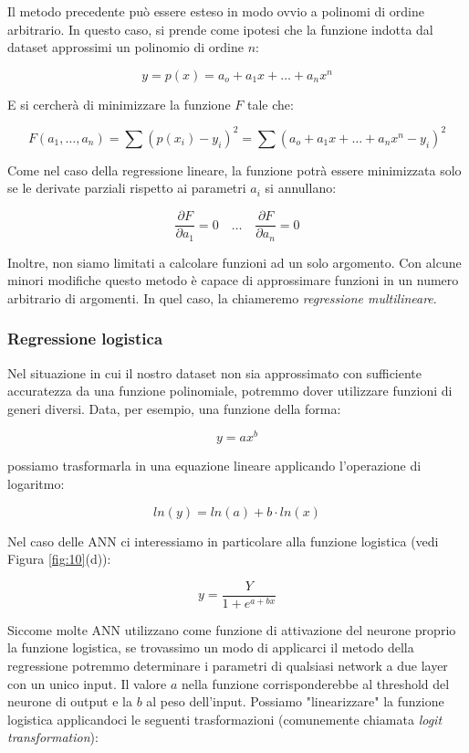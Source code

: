 \documentclass[10pt,a4paper]{article}
\begin{document}
Il metodo precedente può essere esteso in modo ovvio a polinomi di ordine arbitrario. In questo caso, si prende come ipotesi che la funzione indotta dal dataset approssimi un polinomio di ordine $n$:

$$
y = p(x) = a_o + a_1x + \dots + a_nx^n
$$

E si cercherà di minimizzare la funzione $F$ tale che:

$$
F(a_1,\dots,a_n) = \sum(p(x_i) - y_i)^2 = \sum(a_o + a_1x + \dots + a_nx^n -y_i)^2
$$

Come nel caso della regressione lineare, la funzione potrà essere minimizzata solo se le derivate parziali rispetto ai parametri $a_i$ si annullano:

$$
\frac{\partial F}{\partial a_1} = 0 \quad \dots \quad \frac{\partial F}{\partial a_n} = 0
$$

Inoltre, non siamo limitati a calcolare funzioni ad un solo argomento. Con alcune minori modifiche questo metodo è capace di approssimare funzioni in un numero arbitrario di argomenti. In quel caso, la chiameremo \emph{regressione multilineare}.

\subsubsection{Regressione logistica}

Nel situazione in cui il nostro dataset non sia approssimato con sufficiente accuratezza da una funzione polinomiale, potremmo dover utilizzare funzioni di generi diversi. Data, per esempio, una funzione della forma:

$$
y = ax^b
$$

possiamo trasformarla in una equazione lineare applicando l'operazione di logaritmo:

$$
ln(y) = ln(a) + b \cdot ln(x)
$$

Nel caso delle ANN ci interessiamo in particolare alla funzione logistica (vedi Figura \ref{fig:10}(d)):

$$
y = \frac{Y}{1 + e^{a+bx}}
$$

Siccome molte ANN utilizzano come funzione di attivazione del neurone proprio la funzione logistica, se trovassimo un modo di applicarci il metodo della regressione potremmo determinare i parametri di qualsiasi network a due layer con un unico input. Il valore $a$ nella funzione corrisponderebbe al threshold del neurone di output e la $b$ al peso dell'input. Possiamo "linearizzare" la funzione logistica applicandoci le seguenti trasformazioni (comunemente chiamata \emph{logit transformation}):
\end{document}
